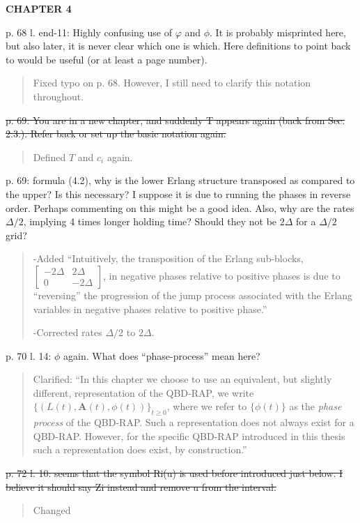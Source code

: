 \documentclass[a4paper]{article}
\begin{document}
\noindent\textbf{CHAPTER 4}

p. 68 l. end-11: Highly confusing use of \(\varphi\) and \(\phi\). It is probably misprinted here, but also later, it is never clear which one is which. Here definitions to point back to would be useful (or at least a page number).
\begin{quote}
    Fixed typo on p. 68. However, I still need to clarify this notation throughout. 
\end{quote}

\st{p. 69: You are in a new chapter, and suddenly T appears again (back from Sec. 2.3.). Refer back or set up the basic notation again.}
\begin{quote}
    Defined \(T\) and \(c_i\) again. 
\end{quote}

p. 69: formula (4.2), why is the lower Erlang structure transposed as compared to the upper? Is this necessary? I suppose it is due to running the phases in reverse order. Perhaps commenting on this might be a good idea. Also, why are the rates \(\Delta/2\), implying 4 times longer holding time? Should they not be \(2\Delta\) for a \(\Delta/2\) grid?
\begin{quote}
    -Added ``Intuitively, the transposition of the Erlang sub-blocks, \(\left[\begin{array}{cc} -2\Delta & 2\Delta \\ 0 & -2\Delta \end{array}\right]\), in negative phases relative to positive phases is due to ``reversing'' the progression of the jump process associated with the Erlang variables in negative phases relative to positive phase.''
    
    -Corrected rates \(\Delta/2\) to \(2\Delta\).  
\end{quote}

p. 70 l. 14: \(\phi\) again. What does “phase-process” mean here? 
\begin{quote}
    Clarified: ``In this chapter we choose to use an equivalent, but slightly different, representation of the QBD-RAP, we write \(\{(L(t),\boldsymbol A(t),\phi(t))\}_{t\geq 0}\), where we refer to \(\{\phi(t)\}\) as the \emph{phase process} of the QBD-RAP. Such a representation does not always exist for a QBD-RAP. However, for the specific QBD-RAP introduced in this thesis such a representation does exist, by construction.''
\end{quote}

\st{p. 72 l. 10: seems that the symbol Ri(u) is used before introduced just below. I believe
it should say Zi instead and remove u from the interval.}
\begin{quote}
    Changed
\end{quote}
\end{document}
